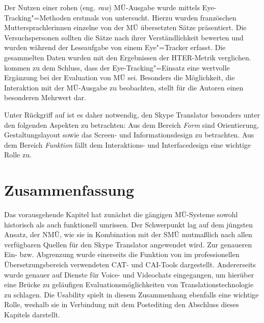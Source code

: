 Der Nutzen einer rohen (eng. \emph{raw}) MÜ-Ausgabe wurde mittels Eye-Tracking"=Methoden erstmals von \citeauthor{doherty_eye_2010} untersucht. Hierzu wurden französchen Muttersprachler{\textperiodcentered}innen einzelne von der MÜ übersetzten Sätze präsentiert. Die Versuchspersonen sollten die Sätze nach ihrer Verständlichkeit bewerten und wurden während der Leseaufgabe von einem Eye"=Tracker erfasst. Die gesammelten Daten wurden mit den Ergebnissen der HTER-Metrik verglichen. \citet[]{doherty_eye_2010} kommen zu dem Schluss, dass der Eye-Tracking"=Einsatz eine wertvolle Ergänzung bei der Evaluation von MÜ sei. Besonders die Möglichkeit, die Interaktion mit der MÜ-Ausgabe zu beobachten, stellt für die Autoren einen besonderen Mehrwert dar.

Unter Rückgriff auf \citeauthor{stapelkamp_screen-_2007} ist es daher notwendig, den Skype Translator besonders unter den folgenden Aspekten zu betrachten: Aus dem Bereich \emph{Form} sind Orientierung, Gestaltungslayout sowie das Screen- und Informationsdesign zu betrachten. Aus dem Bereich \emph{Funktion} fällt dem Interaktions- und Interfacedesign eine wichtige Rolle zu.
 
 


\section{Zusammenfassung}
\label{K3:sec:Zusammenfassung}


Das vorausgehende Kapitel hat zunächst die gängigen MÜ-Systeme sowohl historisch als auch funktionell umrissen. Der Schwerpunkt lag auf dem jüngsten Ansatz, der NMÜ, wie sie in Kombination mit der SMÜ mutmaßlich nach allen verfügbaren Quellen für den Skype Translator angewendet wird. Zur genaueren Ein- bzw. Abgrenzung wurde einerseits die Funktion von im professionellen Übersetzungsbereich verwendeten CAT- und CAI-Tools dargestellt. Andererseits wurde genauer auf Dienste für Voice- und Videochats eingegangen, um hierüber eine Brücke zu geläufigen Evaluationsmöglichkeiten von Translationstechnologie zu schlagen. Die Usability spielt in diesem Zusammenhang ebenfalls eine wichtige Rolle, weshalb sie in Verbindung mit dem Postediting den Abschluss dieses Kapitels darstellt.

